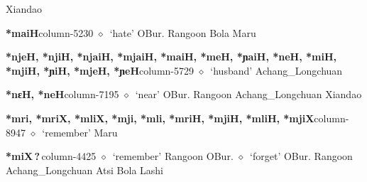 \hspace{1ex}
         Xiandao 
  \item {\footnotesize \textbf{*maiH}}{\tiny column-5230}
         $\diamond$~`hate'
         OBur. 
\hspace{1ex}
         Rangoon 
\hspace{1ex}
         Bola 
\hspace{1ex}
         Maru 
  \item {\footnotesize \textbf{*njeH, *njiH, *njaiH, *mjaiH, *maiH, *meH, *ɲaiH, *neH, *miH, *mjiH, *ɲiH, *mjeH, *ɲeH}}{\tiny column-5729}
         $\diamond$~`husband'
         Achang\_Longchuan 
  \item {\footnotesize \textbf{*nɛH, *neH}}{\tiny column-7195}
         $\diamond$~`near'
         OBur. 
\hspace{1ex}
         Rangoon 
\hspace{1ex}
         Achang\_Longchuan 
\hspace{1ex}
         Xiandao 
  \item {\footnotesize \textbf{*mri, *mriX, *mliX, *mji, *mli, *mriH, *mjiH, *mliH, *mjiX}}{\tiny column-8947}
         $\diamond$~`remember'
         Maru 
  \item {\footnotesize \textbf{*miX\,?\,}}{\tiny column-4425}
         $\diamond$~`remember'
         Rangoon 
\hspace{1ex}
         OBur. 
\hspace{1ex}
         $\diamond$~`forget'
         OBur. 
\hspace{1ex}
         Rangoon 
\hspace{1ex}
         Achang\_Longchuan 
\hspace{1ex}
         Atsi 
\hspace{1ex}
         Bola 
\hspace{1ex}
         Lashi 
\hspace{1ex}
